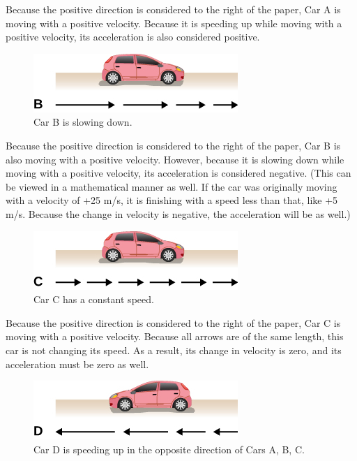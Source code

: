 \documentclass[
]{book}
\begin{document}
Because the positive direction is considered to the right of the paper,
Car A is moving with a positive velocity. Because it is speeding up
while moving with a positive velocity, its acceleration is also
considered positive.

\begin{figure}
\hypertarget{fs-id3242689}{%
\centering
\includegraphics{images/Figure_Ch2_M4_03.jpg}
\caption{Car B is slowing down.}\label{fs-id3242689}
}
\end{figure}

Because the positive direction is considered to the right of the paper,
Car B is also moving with a positive velocity. However, because it is
slowing down while moving with a positive velocity, its acceleration is
considered negative. (This can be viewed in a mathematical manner as
well. If the car was originally moving with a velocity of +25 m/s, it is
finishing with a speed less than that, like +5 m/s. Because the change
in velocity is negative, the acceleration will be as well.)

\begin{figure}
\hypertarget{fs-id2186010}{%
\centering
\includegraphics{images/Figure_Ch2_M4_04.jpg}
\caption{Car C has a constant
speed.}\label{fs-id2186010}
}
\end{figure}

Because the positive direction is considered to the right of the paper,
Car C is moving with a positive velocity. Because all arrows are of the
same length, this car is not changing its speed. As a result, its change
in velocity is zero, and its acceleration must be zero as well.

\begin{figure}
\hypertarget{fs-id2672786}{%
\centering
\includegraphics{images/Figure_Ch2_M4_05.jpg}
\caption{Car D is speeding up in the opposite direction of Cars A, B,
C.}\label{fs-id2672786}
}
\end{figure}
\end{document}
